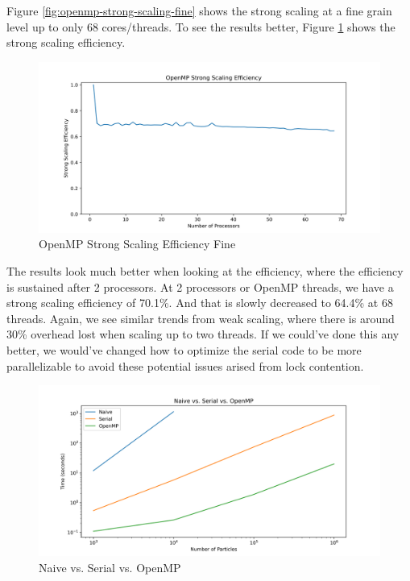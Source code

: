 \documentclass{article}
\begin{document}
Figure \ref{fig:openmp-strong-scaling-fine} shows the strong scaling at a fine grain level up to only 68 cores/threads. To see the results better, Figure \ref{fig:openmp-strong-scaling-efficiency-fine} shows the strong scaling efficiency.

\begin{figure}[H]
\centering
\includegraphics[width=6in]{figures/openmp_strong_scaling_efficiency_fine.png}
\caption{OpenMP Strong Scaling Efficiency Fine}
\label{fig:openmp-strong-scaling-efficiency-fine}
\end{figure}

The results look much better when looking at the efficiency, where the efficiency is sustained after 2 processors. At 2 processors or OpenMP threads, we have a strong scaling efficiency of 70.1\%. And that is slowly decreased to 64.4\% at 68 threads. Again, we see similar trends from weak scaling, where there is around 30\% overhead lost when scaling up to two threads. If we could've done this any better, we would've changed how to optimize the serial code to be more parallelizable to avoid these potential issues arised from lock contention.

\begin{figure}[H]
\centering
\includegraphics[width=6in]{figures/openmp_compared.png}
\caption{Naive vs. Serial vs. OpenMP}
\label{fig:openmp-compared}
\end{figure}
\end{document}
